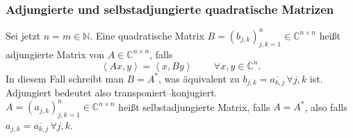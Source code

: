 \documentclass[a4paper,12pt]{article}
\begin{document}
\subsubsection{Adjungierte und selbstadjungierte quadratische Matrizen}
Sei jetzt $n=m \in \mathbb{N}$. Eine quadratische Matrix $B=\left(b_{j,k}\right)_{j,k=1}^n  \in \mathbb{C}^{n\times n}$ heißt adjungierte Matrix von $A \in \mathbb{C}^{n\times n}$, falls
\[ 
        \left\langle Ax,y\right\rangle =\left\langle x,By\right\rangle \qquad \,\forall x,y \in \mathbb{C}^n
.\] 
In diesem Fall schreibt man $B=A^*$, was äquivalent zu $b_{j,k}=\overline{a_{k,j}}\,\forall j,k$ ist. Adjungiert bedeutet also transponiert--konjugiert.\\\indent
$A=\left(a_{j,k}\right)_{j,k=1}^n  \in \mathbb{C}^{n\times n}$ heißt selbstadjungierte Matrix, falls $A=A^*$, also falls $a_{j,k}=\overline{a_{k,j}}\,\forall j,k$.
\end{document}
